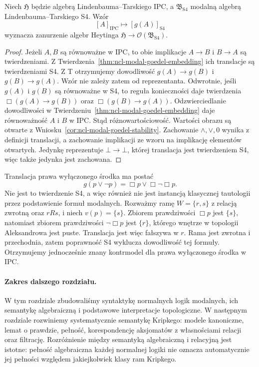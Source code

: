 \begin{wniosek}
\label{cor:ncl-modal-goedel-lindenbaum}
Niech $\mathfrak H$ będzie algebrą
Lindenbauma--Tarskiego IPC, a
$\mathfrak B_{\mathrm{S4}}$ modalną algebrą
Lindenbauma--Tarskiego S4. Wzór
\[
 [A]_{\mathrm{IPC}}\longmapsto[g(A)]_{\mathrm{S4}}
\]
wyznacza zanurzenie algebr Heytinga
$\mathfrak H\to\mathcal O(\mathfrak B_{\mathrm{S4}})$.
\end{wniosek}
\begin{proof}
Jeżeli $A,B$ są równoważne w IPC, to obie
implikacje $A\to B$ i $B\to A$ są twierdzeniami.
Z Twierdzenia~\ref{thm:ncl-modal-goedel-embedding}
ich translacje są twierdzeniami S4.
Z T otrzymujemy dowodliwość
$g(A)\to g(B)$ i $g(B)\to g(A)$.
Wzór nie zależy zatem od reprezentanta.
Odwrotnie, jeśli $g(A)$ i $g(B)$ są
równoważne w S4, to reguła konieczności
daje twierdzenia $\Box(g(A)\to g(B))$ oraz
$\Box(g(B)\to g(A))$.
Odzwierciedlanie dowodliwości w
Twierdzeniu~\ref{thm:ncl-modal-goedel-embedding}
daje równoważność $A$ i $B$ w IPC.
Stąd różnowartościowość.
Wartości obrazu są otwarte z
Wniosku~\ref{cor:ncl-modal-goedel-stability}.
Zachowanie $\wedge,\vee,0$ wynika z definicji
translacji, a zachowanie implikacji ze wzoru
na implikację elementów otwartych.
Jedynkę reprezentuje $\bot\to\bot$,
której translacja jest twierdzeniem S4,
więc także jedynka jest zachowana.
\end{proof}

\begin{przyklad}
\label{ex:ncl-modal-goedel-excluded-middle}
Translacja prawa wyłączonego środka ma postać
\[
 g(p\vee\neg p)=\Box p\vee\Box\neg\Box p.
\]
Nie jest to twierdzenie S4, a więc również
nie jest instancją klasycznej tautologii
przez podstawienie formuł modalnych.
Rozważmy ramę $W=\{r,s\}$ z relacją zwrotną
oraz $rRs$, i niech $v(p)=\{s\}$.
Zbiorem prawdziwości $\Box p$ jest $\{s\}$,
natomiast zbiorem prawdziwości $\neg\Box p$
jest $\{r\}$, którego wnętrze w topologii
Aleksandrowa jest puste.
Translacja jest więc fałszywa w $r$.
Rama jest zwrotna i przechodnia, zatem
poprawność S4 wyklucza dowodliwość tej formuły.
Otrzymujemy jednocześnie znany kontrmodel
dla prawa wyłączonego środka w IPC.
\end{przyklad}

\paragraph{Zakres dalszego rozdziału.}
W tym rozdziale zbudowaliśmy syntaktykę
normalnych logik modalnych, ich semantykę
algebraiczną i podstawowe interpretacje
topologiczne. W następnym rozdziale
rozwiniemy systematycznie semantykę Kripkego:
modele kanoniczne, lemat o prawdzie, pełność,
korespondencję aksjomatów z własnościami relacji
oraz filtrację. Rozróżnienie między semantyką
algebraiczną i relacyjną jest istotne:
pełność algebraiczna każdej normalnej logiki
nie oznacza automatycznie jej pełności względem
jakiejkolwiek klasy ram Kripkego.
